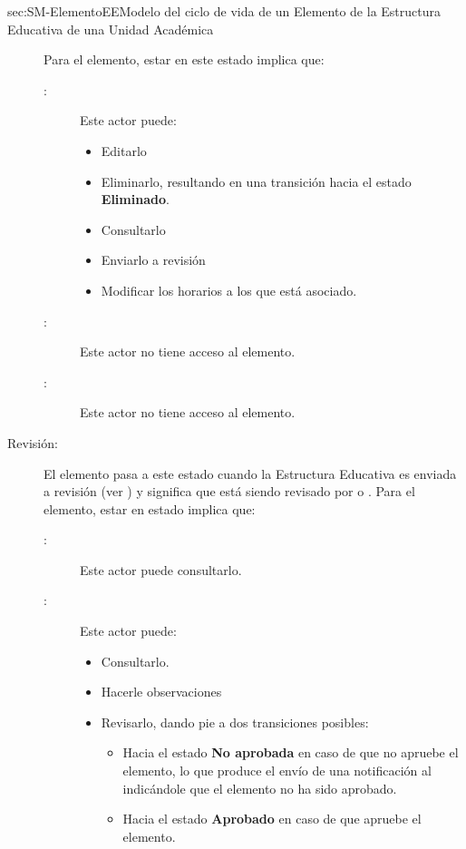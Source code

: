 \begin{Maquina}{sec:SM-ElementoEE}{Modelo del ciclo de vida de un Elemento de la Estructura Educativa de una Unidad Académica}
\begin{description}
Para el elemento, estar en este estado implica que:
	\begin{description}
		\item[:] Este actor puede:
		\begin{itemize} 
			\item Editarlo
			\item Eliminarlo, resultando en una transición hacia el estado {\bf Eliminado}.
			\item Consultarlo
			\item Enviarlo a revisión
			\item Modificar los horarios a los que está asociado.
		\end{itemize}
	
		\item[:] Este actor no tiene acceso al elemento.
		
		\item[:] Este actor no tiene acceso al elemento.
	\end{description}

\item[Revisión:] El elemento pasa a este estado cuando la Estructura Educativa es enviada a revisión (ver ) y significa que está siendo revisado por  o . Para el elemento, estar en estado implica que:
	\begin{description}
		\item[:] Este actor puede consultarlo.
		
		\item[:] Este actor puede:
		\begin{itemize} 
			\item Consultarlo.
			\item Hacerle observaciones
			\item Revisarlo, dando pie a dos transiciones posibles:
			\begin{itemize} 
				\item Hacia el estado {\bf No aprobada} en caso de que no apruebe el elemento, lo que produce el envío de una notificación al  indicándole que el elemento no ha sido aprobado.
				\item Hacia el estado {\bf Aprobado} en caso de que apruebe el elemento.
			\end{itemize}
		\end{itemize}
	

\end{description}
\end{description}
\end{Maquina}
